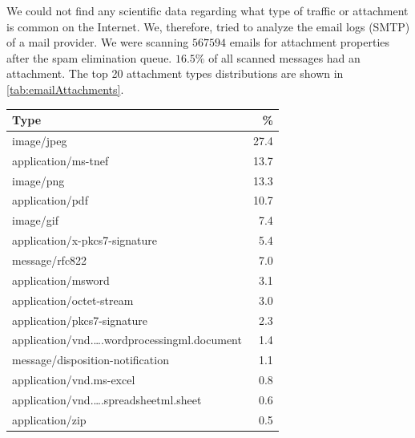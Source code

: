 We could not find any scientific data regarding what type of traffic or attachment is common on the Internet. We, therefore, tried to analyze the email logs (SMTP) of a mail provider. We were scanning $567594$ emails for attachment properties after the spam elimination queue. $16.5\%$ of all scanned messages had an attachment. The top 20 attachment types distributions are shown in \cref{tab:emailAttachments}.
\begin{table}[ht]
	
	\begin{tabular}{l|r}\hline
		Type                                                                        & \%\\\hline
		image/jpeg                                                                  &    27.4\\
		application/ms-tnef                                                         &    13.7\\
		image/png                                                                   &    13.3\\
		application/pdf                                                             &    10.7\\
		image/gif                                                                   &    7.4\\
		application/x-pkcs7-signature                                               &    5.4\\
		message/rfc822                                                              &    7.0\\
		application/msword                                                          &    3.1\\
		application/octet-stream                                                    &    3.0\\
		application/pkcs7-signature                                                 &    2.3\\
		application/vnd.\ldots.wordprocessingml.document                            &     1.4\\
		message/disposition-notification                                            &    1.1\\
		application/vnd.ms-excel                                                    &    0.8\\
		application/vnd.\ldots.spreadsheetml.sheet                                  &    0.6\\
		application/zip                                                             &    0.5\\

\end{tabular}
\end{table}
